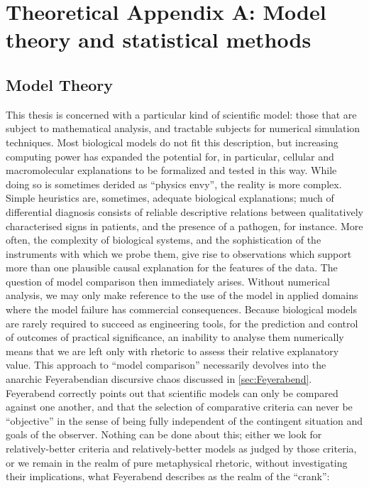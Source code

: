\chapter{Theoretical Appendix A: Model theory and statistical methods}

\section{Model Theory}
This thesis is concerned with a particular kind of scientific model: those that are subject to mathematical analysis, and tractable subjects for numerical simulation techniques. Most biological models do not fit this description, but increasing computing power has expanded the potential for, in particular, cellular and macromolecular explanations to be formalized and tested in this way. While doing so is sometimes derided as ``physics envy'', the reality is more complex. Simple heuristics are, sometimes, adequate biological explanations; much of differential diagnosis consists of reliable descriptive relations between qualitatively characterised signs in patients, and the presence of a pathogen, for instance. More often, the complexity of biological systems, and the sophistication of the instruments with which we probe them, give rise to observations which support more than one plausible causal explanation for the features of the data. The question of model comparison then immediately arises. Without numerical analysis, we may only make reference to the use of the model in applied domains where the model failure has commercial consequences. Because biological models are rarely required to succeed as engineering tools, for the prediction and control of outcomes of practical significance, an inability to analyse them numerically means that we are left only with rhetoric to assess their relative explanatory value. This approach to ``model comparison'' necessarily devolves into the anarchic Feyerabendian discursive chaos discussed in \autoref{sec:Feyerabend}. Feyerabend correctly points out that scientific models can only be compared against one another, and that the selection of comparative criteria can never be ``objective'' in the sense of being fully independent of the contingent situation and goals of the observer. Nothing can be done about this; either we look for relatively-better criteria and relatively-better models as judged by those criteria, or we remain in the realm of pure metaphysical rhetoric, without investigating their implications, what Feyerabend describes as the realm of the ``crank'':


